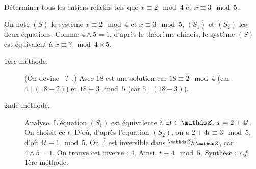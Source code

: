 \begin{exo}
	\begin{slshape}
		Déterminer tous les entiers relatifs tels que $x \equiv 2 \mod 4$ et $x \equiv 3 \mod 5$.
	\end{slshape}

	On note $(S)$ le système $x \equiv 2 \mod 4$ et $x \equiv 3 \mod 5$, $(S_1)$ et $(S_2)$ les deux équations.
	Comme $4 \wedge 5 = 1$, d'après le théorème chinois, le système $(S)$ est équivalent à $x \equiv {?} \mod {4 \times 5}$.
	\begin{description}
		\item[1ère méthode.] (On devine \guillemotleft~$?$~\guillemotright.) Avec 18 est une solution car $18 \equiv 2 \mod 4$ (car $4  \mid (18 - 2)$) et $18 \equiv 3 \mod 5$ (car $5  \mid (18 - 3)$).
		\item [2nde méthode.] Analyse. L'équation $(S_1)$ est équivalente à $\exists t \in \Z,\: x = 2 + 4 t$. On choisit ce $t$. D'où, d'après l'équation $(S_2)$, on a $2 + 4t \equiv 3 \mod 5$, d'où $4t \equiv 1 \mod 5$. Or, $\bar 4$ est inversible dans $\sfrac\Z{5\Z}$, car $4 \wedge 5 = 1$. On trouve cet inverse : $4$. Ainsi, $t \equiv 4 \mod 5$. Synthèse : \textit{c.f.} 1ère méthode.
	\end{description}
\end{exo}

